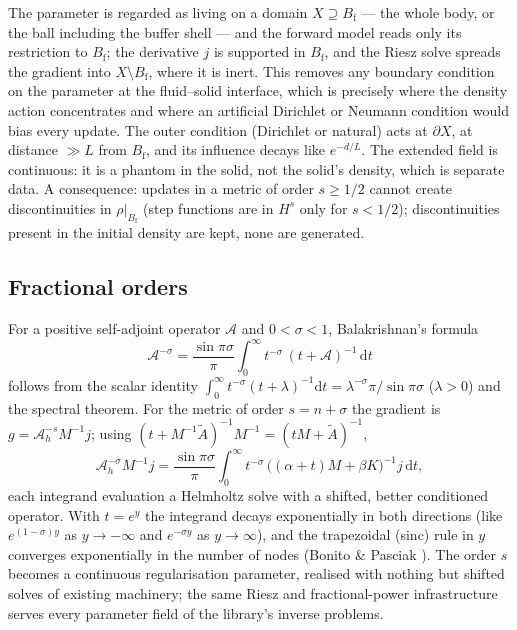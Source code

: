 \documentclass[11pt]{article}
\newcommand{\Bf}{B_{\mathrm{f}}}
\begin{document}
The parameter is regarded as living on a domain $X \supseteq \Bf$ ---
the whole body, or the ball including the buffer shell --- and the
forward model reads only its restriction to $\Bf$; the derivative $j$ is
supported in $\Bf$, and the Riesz solve spreads the gradient into
$X\setminus\Bf$, where it is inert. This removes any boundary condition
on the parameter at the fluid--solid interface, which is precisely where
the density action concentrates and where an artificial Dirichlet or
Neumann condition would bias every update. The outer condition (Dirichlet
or natural) acts at $\partial X$, at distance $\gg L$ from $\Bf$, and its
influence decays like $e^{-d/L}$. The extended field is continuous: it is
a phantom in the solid, not the solid's density, which is separate data.
A consequence: updates in a metric of order $s \ge 1/2$ cannot create
discontinuities in $\rho|_{\Bf}$ (step functions are in $H^s$ only for
$s < 1/2$); discontinuities present in the initial density are kept,
none are generated.

\subsection{Fractional orders}

For a positive self-adjoint operator $\mathcal{A}$ and $0 < \sigma < 1$,
Balakrishnan's formula \cite{Balakrishnan1960}
\begin{equation}
  \mathcal{A}^{-\sigma} = \frac{\sin\pi\sigma}{\pi}\int_0^\infty
  t^{-\sigma}\,(t + \mathcal{A})^{-1}\,\mathrm{d}t
  \label{eq:balakrishnan}
\end{equation}
follows from the scalar identity $\int_0^\infty t^{-\sigma}(t+\lambda)^{-1}
\mathrm{d}t = \lambda^{-\sigma}\pi/\sin\pi\sigma$ ($\lambda > 0$) and
the spectral theorem. For the metric of order $s = n + \sigma$ the
gradient is $g = \mathcal{A}_h^{-s}M^{-1}j$; using
$(t + M^{-1}\tilde A)^{-1}M^{-1} = (tM + \tilde A)^{-1}$,
\begin{equation}
  \mathcal{A}_h^{-\sigma}M^{-1}j = \frac{\sin\pi\sigma}{\pi}
  \int_0^\infty t^{-\sigma}\,\bigl((\alpha + t)M + \beta K\bigr)^{-1} j\,\mathrm{d}t ,
\end{equation}
each integrand evaluation a Helmholtz solve with a shifted, better
conditioned operator. With $t = e^{y}$ the integrand decays exponentially
in both directions (like $e^{(1-\sigma)y}$ as $y\to-\infty$ and
$e^{-\sigma y}$ as $y\to\infty$), and the trapezoidal (sinc) rule in $y$
converges exponentially in the number of nodes (Bonito \& Pasciak
\cite{BonitoPasciak2015}). The order $s$ becomes a continuous
regularisation parameter, realised with nothing but shifted solves of
existing machinery; the same Riesz and fractional-power infrastructure
serves every parameter field of the library's inverse problems.
\end{document}
